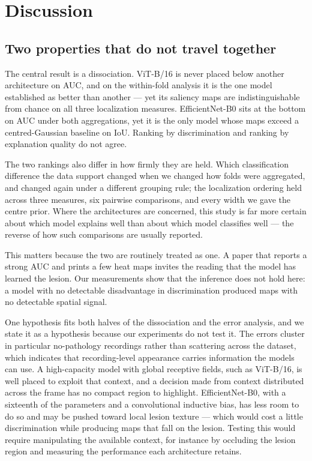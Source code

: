 \documentclass[preprint,12pt]{elsarticle}
\begin{document}
\section{Discussion}
\label{sec:discussion}

\subsection{Two properties that do not travel together}

The central result is a dissociation. ViT-B/16 is never placed below another architecture on AUC, and on the within-fold analysis it is the one model established as better than another --- yet its saliency maps are indistinguishable from chance on all three localization measures. EfficientNet-B0 sits at the bottom on AUC under both aggregations, yet it is the only model whose maps exceed a centred-Gaussian baseline on IoU. Ranking by discrimination and ranking by explanation quality do not agree.

The two rankings also differ in how firmly they are held. Which classification difference the data support changed when we changed how folds were aggregated, and changed again under a different grouping rule; the localization ordering held across three measures, six pairwise comparisons, and every width we gave the centre prior. Where the architectures are concerned, this study is far more certain about which model explains well than about which model classifies well --- the reverse of how such comparisons are usually reported.

This matters because the two are routinely treated as one. A paper that reports a strong AUC and prints a few heat maps invites the reading that the model has learned the lesion. Our measurements show that the inference does not hold here: a model with no detectable disadvantage in discrimination produced maps with no detectable spatial signal.

One hypothesis fits both halves of the dissociation and the error analysis, and we state it as a hypothesis because our experiments do not test it. The errors cluster in particular no-pathology recordings rather than scattering across the dataset, which indicates that recording-level appearance carries information the models can use. A high-capacity model with global receptive fields, such as ViT-B/16, is well placed to exploit that context, and a decision made from context distributed across the frame has no compact region to highlight. EfficientNet-B0, with a sixteenth of the parameters and a convolutional inductive bias, has less room to do so and may be pushed toward local lesion texture --- which would cost a little discrimination while producing maps that fall on the lesion. Testing this would require manipulating the available context, for instance by occluding the lesion region and measuring the performance each architecture retains.
\end{document}
